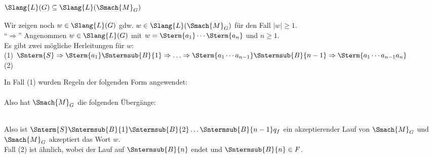 \documentclass[aspectratio=1610,onlymath]{beamer}
\begin{document}
\begin{frame}[t]\frametitle{$\Slang{L}(G)\subseteq\Slang{L}(\Smach{M}_G)$}

Wir zeigen noch $w\in\Slang{L}(G)$ gdw. $w\in\Slang{L}(\Smach{M}_G)$ für den Fall $|w|\geq 1$.\\[1ex]

"`$\Rightarrow$"' Angenommen $w\in\Slang{L}(G)$ mit $w=\Sterm{a_1}\cdots\Sterm{a_n}$ und $n\geq 1$.\pause\\[1ex]

Es gibt zwei mögliche Herleitungen für $w$:\\[1ex]

(1) $\Snterm{S}\Rightarrow \Sterm{a_1}\Sntermsub{B}{1} \Rightarrow \ldots \Rightarrow
\Sterm{a_1\cdots a_{n-1}}\Sntermsub{B}{n-1}\Rightarrow \Sterm{a_1\cdots a_{n-1}a_n}$\\[1ex]
(2) 
\bigskip\pause

In Fall (1) wurden Regeln der folgenden Form angewendet:\\[1ex]
\pause\\[1ex]
Also hat $\Smach{M}_G$ die folgenden Übergänge: \\[1ex]
\\[1ex]
\pause

Also ist $\Snterm{S}\Sntermsub{B}{1}\Sntermsub{B}{2}\ldots\Sntermsub{B}{n-1}q_f$ ein akzeptierender Lauf von $\Smach{M}_G$
und $\Smach{M}_G$ akzeptiert das Wort $w$.\\[1ex]

Fall (2) ist ähnlich, wobei der Lauf auf $\Sntermsub{B}{n}$ endet und $\Sntermsub{B}{n}\in F$.

\end{frame}
\end{document}
